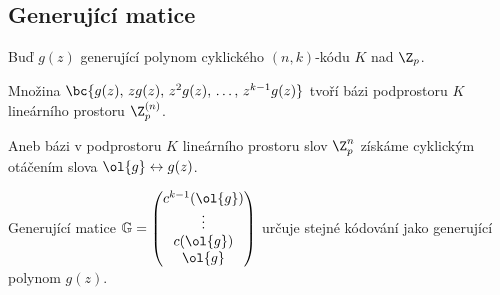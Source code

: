 \subsection{Generující matice}
Buď $g(z)$ generující polynom cyklického $(n,k)$-kódu $K$ nad $\Z_p$.

Množina $\bc{g(z), \, zg(z), \, z^2g(z), \, \dots, \, z^{k-1}g(z)}$ tvoří bázi podprostoru $K$ lineárního prostoru $\Z_p^{(n)}$.

Aneb bázi v podprostoru $K$ lineárního prostoru slov $\Z_p^{n}$ získáme cyklickým otáčením slova $\ol{g} \leftrightarrow g(z)$.

Generující matice $\mathbb{G} = \begin{pmatrix} c^{k-1}(\ol{g}) \\ \vdots \\ c(\ol{g}) \\ \ol{g}\end{pmatrix}$ určuje stejné kódování jako generující polynom $g(z)$.

\dukaz %

